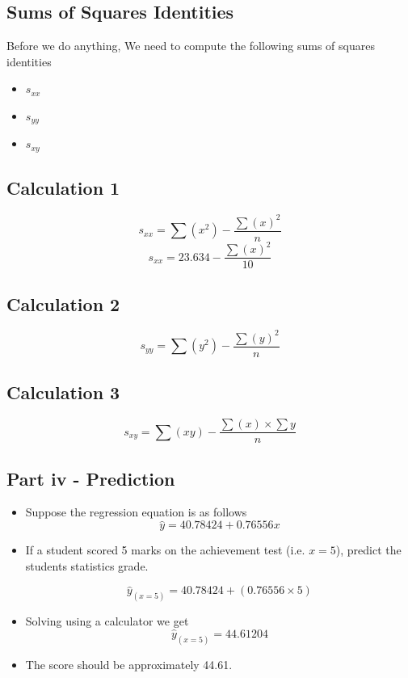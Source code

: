 \documentclass[]{report}
\begin{document}
	
	






%



\subsection*{Sums of Squares Identities}
Before we do anything, We need to compute the following sums of squares identities
\begin{itemize}
	\item $s_{xx}$
	\item $s_{yy}$
	\item $s_{xy}$
\end{itemize}
\subsection*{Calculation 1}
\[ s_{xx}  = \sum(x^2) - \frac{\sum(x)^2}{n} \]
\[ s_{xx}  = 23.634 - \frac{\sum(x)^2}{10} \]

\subsection*{Calculation 2}
\[ s_{yy}  = \sum(y^2) - \frac{\sum(y)^2}{n} \]


\subsection*{Calculation 3}
\[ s_{xy}  = \sum(xy) - \frac{\sum(x)\times \sum{y}}{n} \]


\subsection*{Part iv - Prediction}
\begin{itemize}
	\item Suppose the regression equation is as follows
	\[ \hat{y} = 40.78424 + 0.76556 x \]
	\item If a student scored 5 marks on the achievement test (i.e. $x=5$), predict the students statistics grade.
	
	\[ \hat{y}_{(x=5)} = 40.78424 + (0.76556 \times 5) \]
	
	\item Solving using a calculator we get
	\[ \hat{y}_{(x=5)} = 44.61204 \]
	
	\item The score should be approximately 44.61.
\end{itemize}
\end{document}

